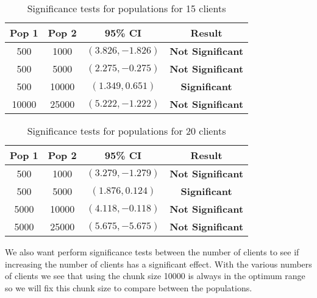 \documentclass[a4paper, 12pt]{article}
\begin{document}
			\begin{table}[H]
				\begin{center}
					\begin{tabular}{| c | c | c | c |}
						\hline
						Pop 1 & Pop 2 & 95\% CI & Result\\
						\hline
						500 & 1000 & $(3.826, -1.826)$ & \textbf{Not Significant}\\
						500 & 5000 & $(2.275, -0.275)$ & \textbf{Not Significant} \\
						500 & 10000 & $(1.349, 0.651)$ & \textbf{Significant} \\
						10000 & 25000 & $(5.222, -1.222)$ & \textbf{Not Significant} \\
					
						\hline
					\end{tabular}
					
					\caption{Significance tests for populations for 15 clients}					
					
				\end{center}
			\end{table}			
			
			\begin{table}[H]
				\begin{center}
					\begin{tabular}{| c | c | c | c |}
						\hline
						Pop 1 & Pop 2 & 95\% CI & Result\\
						\hline
						500 & 1000 & $(3.279, -1.279)$ & \textbf{Not Significant}\\
						500 & 5000 & $(1.876, 0.124)$ & \textbf{Significant} \\
						5000 & 10000 & $(4.118, -0.118)$ & \textbf{Not Significant} \\
						5000 & 25000 & $(5.675, -5.675)$ & \textbf{Not Significant} \\
					
						\hline
					\end{tabular}
					
					\caption{Significance tests for populations for 20 clients}					
					
				\end{center}
			\end{table}						
		
			We also want perform significance tests between the number of clients to see if increasing the number of clients has a significant effect. With the various numbers of clients we see that using the chunk size 10000 is always in the optimum range so we will fix this chunk size to compare between the populations.
			
\end{document}
